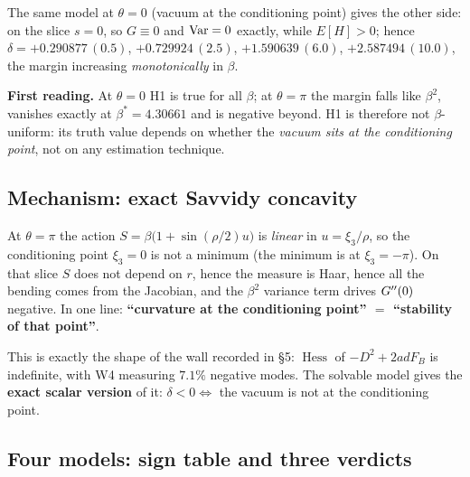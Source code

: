 The same model at $\theta=0$ (vacuum at the conditioning point) gives the other side: on the slice
$s=0$, so $G\equiv0$ and $\operatorname{Var}=0$ exactly, while $E[H]>0$; hence
$\delta=+0.290877\,(0.5)$, $+0.729924\,(2.5)$, $+1.590639\,(6.0)$, $+2.587494\,(10.0)$, the margin
increasing \emph{monotonically} in $\beta$. \LT
{}

\begin{keybox}
\textbf{First reading.} At $\theta=0$ H1 is true for all $\beta$; at $\theta=\pi$ the margin falls
like $\beta^{2}$, vanishes exactly at $\beta^{*}=4.30661$ and is negative beyond. H1 is therefore not
$\beta$-uniform: its truth value depends on whether the \emph{vacuum sits at the conditioning point},
not on any estimation technique. \LN
\end{keybox}

\subsection{Mechanism: exact Savvidy concavity}

At $\theta=\pi$ the action $S=\beta\big(1+\sin(\rho/2)u\big)$ is \emph{linear} in $u=\xi_3/\rho$, so
the conditioning point $\xi_3=0$ is not a minimum (the minimum is at $\xi_3=-\pi$). On that slice $S$
does not depend on $r$, hence the measure is Haar, hence all the bending comes from the Jacobian, and
the $\beta^{2}$ variance term drives $G''(0)$ negative. In one line: \textbf{``curvature at the
conditioning point'' $=$ ``stability of that point''}. \LT
{}

This is exactly the shape of the wall recorded in  \S5: $\operatorname{Hess}$ of
$-D^{2}+2adF_B$ is indefinite, with W4 measuring $7.1\%$ negative modes. The solvable model gives the
\textbf{exact scalar version} of it: $\delta<0 \iff$ the vacuum is not at the conditioning point. \LT
{}

\subsection{Four models: sign table and three verdicts}

